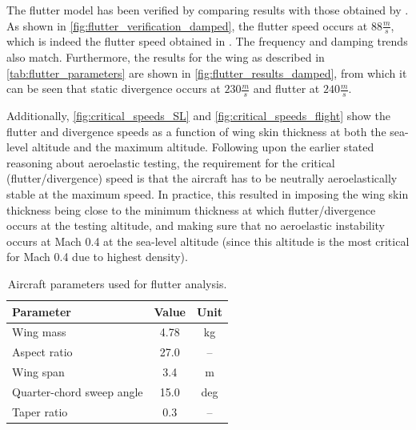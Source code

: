 The flutter model has been verified by comparing results with those obtained by \citeauthor{wright2008introduction} \cite{wright2008introduction}. As shown in \autoref{fig:flutter_verification_damped}, the flutter speed occurs at $88\frac{m}{s}$, which is indeed the flutter speed obtained in \cite{wright2008introduction}. The frequency and damping trends also match. Furthermore, the results for the wing as described in \autoref{tab:flutter_parameters} are shown in \autoref{fig:flutter_results_damped}, from which it can be seen that static divergence occurs at $230\frac{m}{s}$ and flutter at $240\frac{m}{s}$. 

Additionally, \autoref{fig:critical_speeds_SL} and \autoref{fig:critical_speeds_flight} show the flutter and divergence speeds as a function of wing skin thickness at both the sea-level altitude and the maximum altitude. Following upon the earlier stated reasoning about aeroelastic testing, the requirement for the critical (flutter/divergence) speed is that the aircraft has to be neutrally aeroelastically stable at the maximum speed. In practice, this resulted in imposing the wing skin thickness being close to the minimum thickness at which flutter/divergence occurs at the testing altitude, and making sure that no aeroelastic instability occurs at Mach 0.4 at the sea-level altitude (since this altitude is the most critical for Mach 0.4 due to highest density).

\begin{table}[H]
\centering
\caption{Aircraft parameters used for flutter analysis.}
\label{tab:flutter_parameters}
\begin{tabular}{|l|c|c|}
\hline
\textbf{Parameter} & \textbf{Value} & \textbf{Unit} \\
\hline \hline
Wing mass                             & 4.78  & kg \\
\hline

\textbf{}
Aspect ratio                          & 27.0  & -- \\
\hline

\textbf{}
Wing span                             & 3.4   & m \\
\hline

\textbf{}
Quarter-chord sweep angle             & 15.0  &  deg \\
\hline

\textbf{}
Taper ratio                           & 0.3   & -- \\
\hline

\end{tabular}
\end{table}

